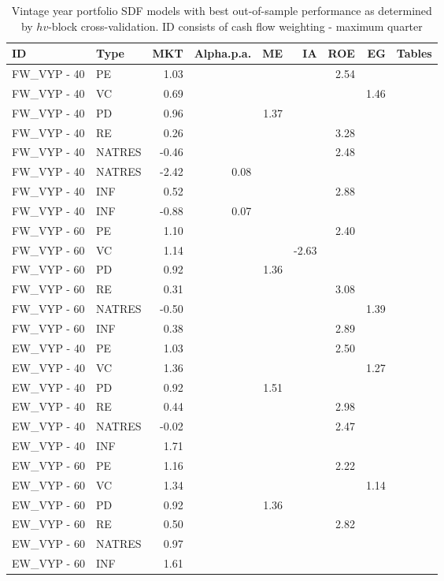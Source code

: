 \documentclass[12pt]{article}
\begin{document}
\begin{table}[ht]
	\centering
	\begin{tabular}{llrrrrrrl}
		\hline
		ID & Type & MKT & Alpha.p.a. & ME & IA & ROE & EG & Tables \\ 
		\hline
		FW\_VYP - 40 & PE & 1.03 &  &  &  & 2.54 &  &  \\ 
		FW\_VYP - 40 & VC & 0.69 &  &  &  &  & 1.46 &  \\ 
		FW\_VYP - 40 & PD & 0.96 &  & 1.37 &  &  &  &  \\ 
		FW\_VYP - 40 & RE & 0.26 &  &  &  & 3.28 &  &  \\ 
		FW\_VYP - 40 & NATRES & -0.46 &  &  &  & 2.48 &  &  \\ 
		FW\_VYP - 40 & NATRES & -2.42 & 0.08 &  &  &  &  &  \\ 
		FW\_VYP - 40 & INF & 0.52 &  &  &  & 2.88 &  &  \\ 
		FW\_VYP - 40 & INF & -0.88 & 0.07 &  &  &  &  &  \\ 
		\hline
		FW\_VYP - 60 & PE & 1.10 &  &  &  & 2.40 &  &  \\ 
		FW\_VYP - 60 & VC & 1.14 &  &  & -2.63 &  &  &  \\ 
		FW\_VYP - 60 & PD & 0.92 &  & 1.36 &  &  &  &  \\ 
		FW\_VYP - 60 & RE & 0.31 &  &  &  & 3.08 &  &  \\ 
		FW\_VYP - 60 & NATRES & -0.50 &  &  &  &  & 1.39 &  \\ 
		FW\_VYP - 60 & INF & 0.38 &  &  &  & 2.89 &  &  \\ 
		\hline
		\hline
		EW\_VYP - 40 & PE & 1.03 &  &  &  & 2.50 &  &  \\ 
		EW\_VYP - 40 & VC & 1.36 &  &  &  &  & 1.27 &  \\ 
		EW\_VYP - 40 & PD & 0.92 &  & 1.51 &  &  &  &  \\ 
		EW\_VYP - 40 & RE & 0.44 &  &  &  & 2.98 &  &  \\ 
		EW\_VYP - 40 & NATRES & -0.02 &  &  &  & 2.47 &  &  \\ 
		EW\_VYP - 40 & INF & 1.71 &  &  &  &  &  &  \\ 
		\hline
		EW\_VYP - 60 & PE & 1.16 &  &  &  & 2.22 &  &  \\ 
		EW\_VYP - 60 & VC & 1.34 &  &  &  &  & 1.14 &  \\ 
		EW\_VYP - 60 & PD & 0.92 &  & 1.36 &  &  &  &  \\ 
		EW\_VYP - 60 & RE & 0.50 &  &  &  & 2.82 &  &  \\ 
		EW\_VYP - 60 & NATRES & 0.97 &  &  &  &  &  &  \\ 
		EW\_VYP - 60 & INF & 1.61 &  &  &  &  &  &  \\ 
		\hline
		\hline
	\end{tabular}
	\caption{Vintage year portfolio SDF models with best out-of-sample performance as determined by $hv$-block cross-validation. ID consists of cash flow weighting - maximum quarter} 
	\label{tab:result_summary_vyp}
\end{table}
\end{document}
